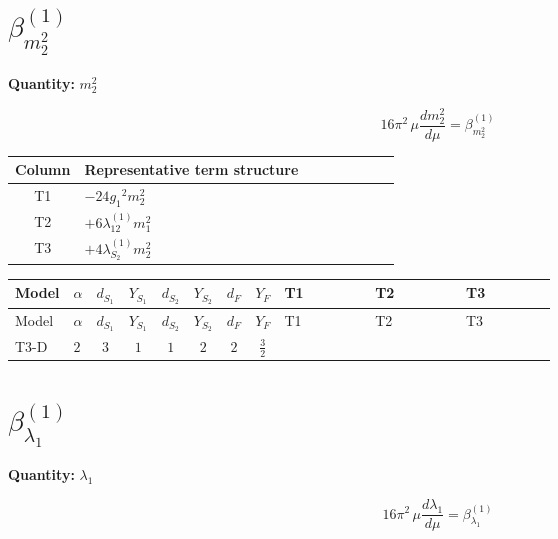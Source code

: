 \documentclass[8pt]{article}
\begin{document}
\begin{landscape}
\section*{$\beta_{m_2^2}^{(1)}$}
\noindent\textbf{Quantity: }$m_2^2$\par\smallskip
\[16\pi^2\,\mu\frac{d m_2^2}{d\mu}=\beta_{m_2^2}^{(1)}\]
\begin{center}
\begin{tabular}{@{}c >{\raggedright\arraybackslash}p{0.82\linewidth}@{}}
\toprule
Column & Representative term structure \\
\midrule
T1 & \(\displaystyle -24 {g_1}^2 {m_2^2}\) \\
\midrule
T2 & \(\displaystyle +6 {\lambda_{12}^{(1)}} {m_1^2}\) \\
\midrule
T3 & \(\displaystyle +4 {\lambda_{S_2}^{(1)}} {m_2^2}\) \\
\midrule
\bottomrule
\end{tabular}
\end{center}
\smallskip
\tiny
\begin{longtable}{@{}llcccccc >{\raggedright\arraybackslash}p{0.21\linewidth} >{\raggedright\arraybackslash}p{0.21\linewidth} >{\raggedright\arraybackslash}p{0.21\linewidth}@{}}
\toprule
Model & $\alpha$ & $d_{S_1}$ & $Y_{S_1}$ & $d_{S_2}$ & $Y_{S_2}$ & $d_F$ & $Y_F$ & T1 & T2 & T3 \\
\midrule
\endfirsthead
\toprule
Model & $\alpha$ & $d_{S_1}$ & $Y_{S_1}$ & $d_{S_2}$ & $Y_{S_2}$ & $d_F$ & $Y_F$ & T1 & T2 & T3 \\
\midrule
\endhead
T3-D & $2$ & $3$ & $1$ & $1$ & $2$ & $2$ & $\frac{3}{2}$ & \scriptsize\adjustbox{max width=\linewidth}{$\begin{gathered} -24 {g_1}^2 {m_2^2}\end{gathered}$} & \scriptsize\adjustbox{max width=\linewidth}{$\begin{gathered} +6 {\lambda_{12}^{(1)}} {m_1^2}\end{gathered}$} & \scriptsize\adjustbox{max width=\linewidth}{$\begin{gathered} +4 {\lambda_{S_2}^{(1)}} {m_2^2}\end{gathered}$} \\
\midrule
\bottomrule
\end{longtable}
\clearpage
\section*{$\beta_{\lambda_1}^{(1)}$}
\noindent\textbf{Quantity: }$\lambda_1$\par\smallskip
\[16\pi^2\,\mu\frac{d \lambda_1}{d\mu}=\beta_{\lambda_1}^{(1)}\]

\end{landscape}
\end{document}
